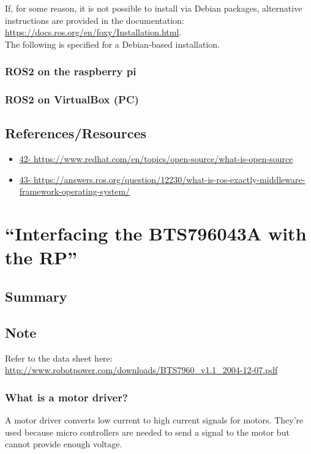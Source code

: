 \documentclass[a4paper, 10pt]{article}
\begin{document}
        If, for some reason, it is not possible to install via Debian packages, alternative instructions are provided in the documentation: \\ \url{https://docs.ros.org/en/foxy/Installation.html}.\\ 
        
        The following is specified for a Debian-based installation. \\
		\subsubsection{ROS2 on the raspberry pi}

		\subsubsection{ROS2 on VirtualBox (PC)}

    \subsection{References/Resources}
        \begin{itemize}
            \item \url{42-	https://www.redhat.com/en/topics/open-source/what-is-open-source}
            \item \url{43-	https://answers.ros.org/question/12230/what-is-ros-exactly-middleware-framework-operating-system/ }
        \end{itemize}
	
\pagebreak

\section{``Interfacing the BTS796043A with the RP''}
    \subsection*{Summary}

    \subsection*{Note}
    Refer to the data sheet here: \\ \url{http://www.robotpower.com/downloads/BTS7960_v1.1_2004-12-07.pdf}

    \subsubsection{What is a motor driver?}
        A motor driver converts low current to high current signals for motors. They're used because micro controllers are needed to send a signal to the motor  but cannot provide enough voltage. 
\end{document}
